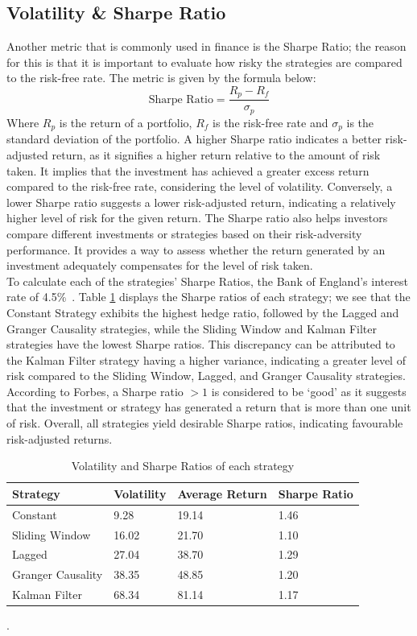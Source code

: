 \subsection{Volatility \& Sharpe Ratio}


Another metric that is commonly used in finance is the Sharpe Ratio; the reason for this is that it is important to evaluate how risky the strategies are compared to the risk-free rate. The metric is given by the formula below:$$\text{Sharpe Ratio} = \frac{R_p - R_f}{\sigma_p}$$ Where $R_p$ is the return of a portfolio, $R_f$ is the risk-free rate and $\sigma_p$ is the standard deviation of the portfolio. A higher Sharpe ratio indicates a better risk-adjusted return, as it signifies a higher return relative to the amount of risk taken. It implies that the investment has achieved a greater excess return compared to the risk-free rate, considering the level of volatility. Conversely, a lower Sharpe ratio suggests a lower risk-adjusted return, indicating a relatively higher level of risk for the given return. The Sharpe ratio also helps investors compare different investments or strategies based on their risk-adversity performance. It provides a way to assess whether the return generated by an investment adequately compensates for the level of risk taken. 
\\[3mm]
To calculate each of the strategies' Sharpe Ratios, the Bank of England's interest rate of 4.5\%~\cite{boe_interest}. Table \ref{tab:sharpes} displays the Sharpe ratios of each strategy; we see that the Constant Strategy exhibits the highest hedge ratio, followed by the Lagged and Granger Causality strategies, while the Sliding Window and Kalman Filter strategies have the lowest Sharpe ratios. This discrepancy can be attributed to the Kalman Filter strategy having a higher variance, indicating a greater level of risk compared to the Sliding Window, Lagged, and Granger Causality strategies. According to Forbes, a Sharpe ratio $>1$ is considered to be `good' as it suggests that the investment or strategy has generated a return that is more than one unit of risk. Overall, all strategies yield desirable Sharpe ratios, indicating favourable risk-adjusted returns.

\begin{table}[H]
    \centering
        \begin{tabular}{|p{7em}|p{7em}|p{7em}|p{7em}|}\hline
            Strategy & Volatility & Average Return & Sharpe Ratio \\\hline
            Constant & 9.28 & 19.14 & 1.46\\\hline
            Sliding Window & 16.02 & 21.70 & 1.10\\\hline
            Lagged & 27.04 & 38.70 & 1.29 \\\hline
            Granger Causality & 38.35 & 48.85 & 1.20\\\hline
            Kalman Filter & 68.34 & 81.14 & 1.17\\\hline
        \end{tabular}
    \caption{Volatility and Sharpe Ratios of each strategy \label{tab:sharpes}}.
\end{table}

